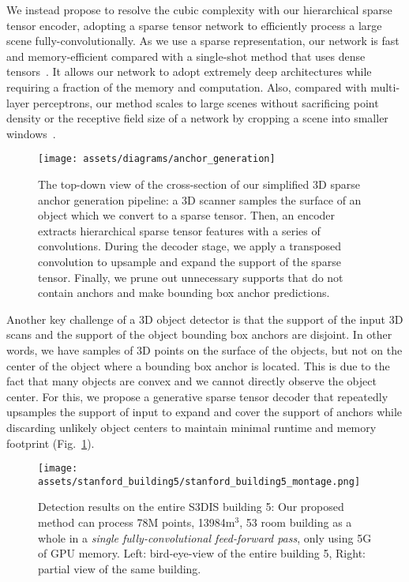\documentclass[runningheads]{llncs}
\begin{document}
We instead propose to resolve the cubic complexity with our hierarchical sparse tensor encoder, adopting a sparse tensor network to efficiently process a large scene fully-convolutionally. As we use a sparse representation, our network is fast and memory-efficient compared with a single-shot method that uses dense tensors~\cite{hou20193d}. It allows our network to adopt extremely deep architectures while requiring a fraction of the memory and computation.
Also, compared with multi-layer perceptrons, our method scales to large scenes without sacrificing point density or the receptive field size of a network by cropping a scene into smaller windows~\cite{qi2019deep,yang2019learning}. 

\begin{figure}[t]
    \centering
    \small
    \texttt{[image: assets/diagrams/anchor\_generation]}
    \caption{The top-down view of the cross-section of our simplified 3D sparse anchor generation pipeline: a 3D scanner samples the surface of an object which we convert to a sparse tensor. Then, an encoder extracts hierarchical sparse tensor features with a series of convolutions. During the decoder stage, we apply a transposed convolution to upsample and expand the support of the sparse tensor. Finally, we prune out unnecessary supports that do not contain anchors and make bounding box anchor predictions.}
    \label{fig:anchor_generation}
    \vspace{-1em}
\end{figure}

Another key challenge of a 3D object detector is that the support of the input 3D scans and the support of the object bounding box anchors are disjoint. In other words, we have samples of 3D points on the surface of the objects, but not on the center of the object where a bounding box anchor is located. This is due to the fact that many objects are convex and we cannot directly observe the object center. For this, we propose a generative sparse tensor decoder that repeatedly upsamples the support of input to expand and cover the support of anchors while discarding unlikely object centers to maintain minimal runtime and memory footprint (Fig.~\ref{fig:anchor_generation}).



\begin{figure}[t]
    \centering
    \texttt{[image: assets/stanford\_building5/stanford\_building5\_montage.png]}
    \caption{Detection results on the entire S3DIS building 5: Our proposed method can process 78M points, 13984m${}^3$, 53 room building as a whole in a \textit{single fully-convolutional feed-forward pass}, only using 5G of GPU memory. Left: bird-eye-view of the entire building 5, Right: partial view of the same building.}
    \label{fig:stanford_full}
    \vspace{-1em}
\end{figure}
\end{document}
